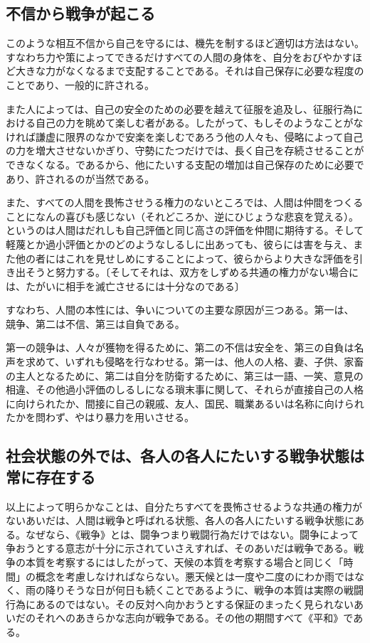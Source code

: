 \subsection{不信から戦争が起こる}




このような相互不信から自己を守るには、機先を制するほど適切は方法はない。すなわち力や策によってできるだけすべての人間の身体を、自分をおびやかすほど大きな力がなくなるまで支配することである。それは自己保存に必要な程度のことであり、一般的に許される。



また人によっては、自己の安全のための必要を越えて征服を追及し、征服行為における自己の力を眺めて楽しむ者がある。したがって、もしそのようなことがなければ謙虚に限界のなかで安楽を楽しむであろう他の人々も、侵略によって自己の力を増大させないかぎり、守勢にたつだけでは、長く自己を存続させることができなくなる。であるから、他にたいする支配の増加は自己保存のために必要であり、許されるのが当然である。



また、すべての人間を畏怖させうる権力のないところでは、人間は仲間をつくることになんの喜びも感じない（それどころか、逆にひじょうな悲哀を覚える）。というのは人間はだれしも自己評価と同じ高さの評価を仲間に期待する。そして軽蔑とか過小評価とかのどのようなしるしに出あっても、彼らには害を与え、また他の者にはこれを見せしめにすることによって、彼らからより大きな評価を引き出そうと努力する。〔そしてそれは、双方をしずめる共通の権力がない場合には、たがいに相手を滅亡させるには十分なのである〕



すなわち、人間の本性には、争いについての主要な原因が三つある。第一は、
競争、第二は不信、第三は自負である。



第一の競争は、人々が獲物を得るために、第二の不信は安全を、第三の自負は名声を求めて、いずれも侵略を行なわせる。第一は、他人の人格、妻、子供、家畜の主人となるために、第二は自分を防衛するために、第三は一語、一笑、意見の相違、その他過小評価のしるしになる瑣末事に関して、それらが直接自己の人格に向けられたか、間接に自己の親戚、友人、国民、職業あるいは名称に向けられたかを問わず、やはり暴力を用いさせる。



\subsection{社会状態の外では、各人の各人にたいする戦争状態は常に存在する}


以上によって明らかなことは、自分たちすべてを畏怖させるような共通の権力がないあいだは、人間は戦争と呼ばれる状態、各人の各人にたいする戦争状態にある。なぜなら、《戦争》とは、闘争つまり戦闘行為だけではない。闘争によって争おうとする意志が十分に示されていさえすれば、そのあいだは戦争である。戦争の本質を考察するにはしたがって、天候の本質を考察する場合と同じく「時間」の概念を考慮しなければならない。悪天候とは一度や二度のにわか雨ではなく、雨の降りそうな日が何日も続くことであるように、戦争の本質は実際の戦闘行為にあるのではない。その反対へ向かおうとする保証のまったく見られないあいだのそれへのあきらかな志向が戦争である。その他の期間すべて《平和》である。



